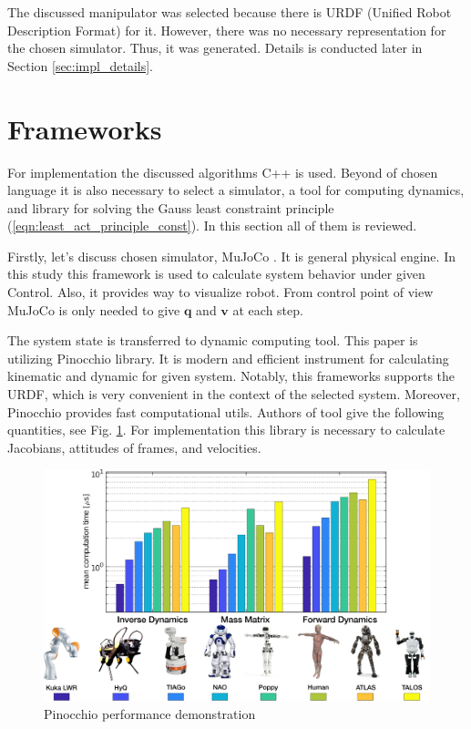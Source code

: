 The discussed manipulator was selected because there is URDF (Unified Robot 
Description Format) for it. However, there was no necessary representation for the 
chosen simulator. Thus, it was generated. Details is conducted later 
in Section \ref{sec:impl_details}.

\section{Frameworks}
\label{sec:frameworks}

For implementation the discussed algorithms C++ is used. Beyond of chosen language 
it is also necessary to select a simulator, a tool for computing dynamics, and 
library for solving the Gauss least constraint principle 
(\ref{eqn:least_act_principle_const}). In this section all of them is reviewed.

Firstly, let's discuss chosen simulator, MuJoCo \cite{MuJoCo}. It is general 
physical engine. In this study this framework is used to calculate system 
behavior under given Control. Also, it provides way to visualize robot. From 
control point of view MuJoCo is only needed to give $\mathbf{q}$ and $\mathbf{v}$ 
at each step. 

The system state is transferred to dynamic computing tool. This paper is utilizing 
Pinocchio \cite{Pinocchio} library. It is modern and efficient instrument for 
calculating kinematic and dynamic for given system. Notably, this frameworks 
supports the URDF, which is very convenient in the context of the selected system. 
Moreover, Pinocchio provides fast computational utils. Authors of tool give 
the following quantities, see Fig. \ref{fig:pin_speed}. For implementation this 
library is necessary to calculate Jacobians, attitudes of frames, and velocities.

\begin{figure}[H]
    \centering
    \includegraphics[scale=0.2]{figs/pin_speed.png}
    \caption{Pinocchio performance demonstration}
    \label{fig:pin_speed}
\end{figure}

